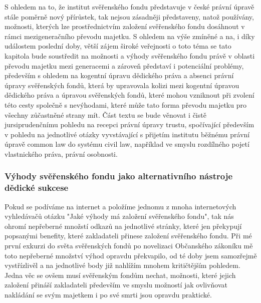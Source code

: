 \documentclass{article}
\begin{document}
S ohledem na to, že institut svěřenského fondu představuje v české právní úpravě stále poměrně nový přírůstek, tak nejsou zásadněji představeny, natož používány, možnosti, kterých lze prostřednictvím založení svěřenského fondu dosáhnout v rámci mezigeneračního převodu majetku. S ohledem na výše zmíněné a na, i díky událostem poslední doby, větší zájem široké veřejnosti o toto téma se tato kapitola bude soustředit na možnosti a výhody svěřenského fondu právě v oblasti převodu majetku mezi generacemi a zároveň představí i potenciální problémy, především s ohledem na kogentní úpravu dědického práva a absenci právní úpravy svěřenských fondů, která by upravovala kolizi mezi kogentní úpravou dědického práva a úpravou svěřenských fondů, které mohou vzniknout při zvolení této cesty společně s nevýhodami, které může tato forma převodu majetku pro všechny zůčastněné strany mít. Část textu se bude věnovat i čistě jursiprudenčnímu pohledu na recepci právní úpravy trustu, spočívající především v pohledu na jednotlivé otázky vyvstávající s přijetím institutu běžnému právní úpravě common law do systému civil law, například ve smyslu rozdílného pojetí vlastnického práva, právní osobnosti.

\subsubsection{Výhody svěřenského fondu jako alternativního nástroje dědické sukcese}




Pokud se podíváme na internet a položíme jednomu z mnoha internetových vyhledávačů otázku "Jaké výhody má založení svěřenského fondu", tak nás ohromí nepřeberné množstí odkazů na jednotlivé stránky, které jen překypují popsanými benefity, které zakladateli přinese založení svěřenského fondu. Při mé první exkurzi do světa svěřenských fondů po novelizaci Občanského zákoníku mě toto nepřeberné množství výhod opravdu překvapilo, od té doby jsem samozřejmě vystřízlivěl a na jednotlivé body již nahlížím mnohem kritičtějším pohledem. Jedna věc se ovšem musí svěřenským fondům nechat, možnosti, které jejich založení přináší zakladateli především ve smyslu možností jak ovlivňovat nakládání se svým majetkem i po své smrti jsou opravdu praktické.\\
\end{document}

